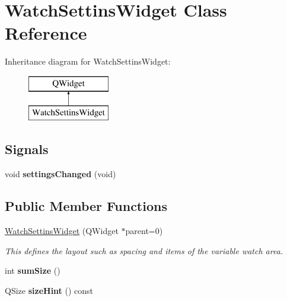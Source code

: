\hypertarget{class_watch_settins_widget}{}\section{Watch\+Settins\+Widget Class Reference}
\label{class_watch_settins_widget}
Inheritance diagram for Watch\+Settins\+Widget\+:\begin{figure}[H]
\begin{center}
\leavevmode
\includegraphics[height=2.000000cm]{class_watch_settins_widget}
\end{center}
\end{figure}
\subsection*{Signals}
\begin{DoxyCompactItemize}
\item 
\hypertarget{class_watch_settins_widget_aa8795e2002112890a4d579e99bc5cd87}{}void {\bfseries settings\+Changed} (void)\label{class_watch_settins_widget_aa8795e2002112890a4d579e99bc5cd87}

\end{DoxyCompactItemize}
\subsection*{Public Member Functions}
\begin{DoxyCompactItemize}
\item 
\hyperlink{class_watch_settins_widget_a6a84d2b11a68201f1a035587757d8fc5}{Watch\+Settins\+Widget} (Q\+Widget $\ast$parent=0)
\begin{DoxyCompactList}\small\item\em This defines the layout such as spacing and items of the variable watch area. \end{DoxyCompactList}\item 
\hypertarget{class_watch_settins_widget_a1d32e0025eb6328e829561fc6b9d62c1}{}int {\bfseries sum\+Size} ()\label{class_watch_settins_widget_a1d32e0025eb6328e829561fc6b9d62c1}

\item 
\hypertarget{class_watch_settins_widget_ae3057ad6e1835532b01be44f0ee02a1f}{}Q\+Size {\bfseries size\+Hint} () const \label{class_watch_settins_widget_ae3057ad6e1835532b01be44f0ee02a1f}

\end{DoxyCompactItemize}
